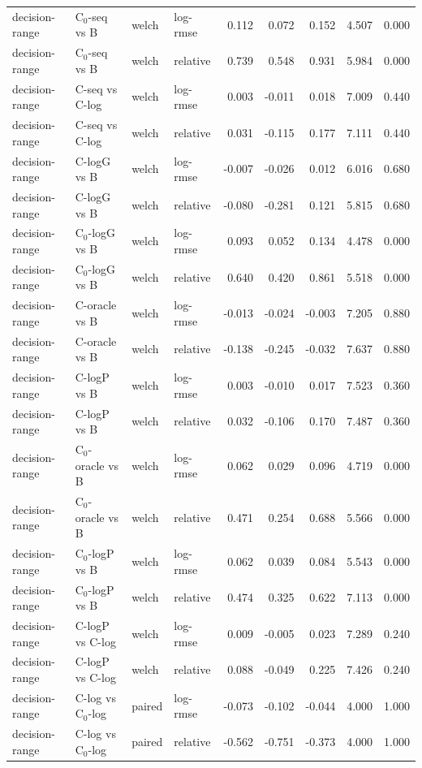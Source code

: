 \begin{longtable}{llllrrrrr}
decision-range & C$_0$-seq vs B & welch & log-rmse & 0.112 & 0.072 & 0.152 & 4.507 & 0.000 \\
decision-range & C$_0$-seq vs B & welch & relative & 0.739 & 0.548 & 0.931 & 5.984 & 0.000 \\
decision-range & C-seq vs C-log & welch & log-rmse & 0.003 & -0.011 & 0.018 & 7.009 & 0.440 \\
decision-range & C-seq vs C-log & welch & relative & 0.031 & -0.115 & 0.177 & 7.111 & 0.440 \\
decision-range & C-logG vs B & welch & log-rmse & -0.007 & -0.026 & 0.012 & 6.016 & 0.680 \\
decision-range & C-logG vs B & welch & relative & -0.080 & -0.281 & 0.121 & 5.815 & 0.680 \\
decision-range & C$_0$-logG vs B & welch & log-rmse & 0.093 & 0.052 & 0.134 & 4.478 & 0.000 \\
decision-range & C$_0$-logG vs B & welch & relative & 0.640 & 0.420 & 0.861 & 5.518 & 0.000 \\
decision-range & C-oracle vs B & welch & log-rmse & -0.013 & -0.024 & -0.003 & 7.205 & 0.880 \\
decision-range & C-oracle vs B & welch & relative & -0.138 & -0.245 & -0.032 & 7.637 & 0.880 \\
decision-range & C-logP vs B & welch & log-rmse & 0.003 & -0.010 & 0.017 & 7.523 & 0.360 \\
decision-range & C-logP vs B & welch & relative & 0.032 & -0.106 & 0.170 & 7.487 & 0.360 \\
decision-range & C$_0$-oracle vs B & welch & log-rmse & 0.062 & 0.029 & 0.096 & 4.719 & 0.000 \\
decision-range & C$_0$-oracle vs B & welch & relative & 0.471 & 0.254 & 0.688 & 5.566 & 0.000 \\
decision-range & C$_0$-logP vs B & welch & log-rmse & 0.062 & 0.039 & 0.084 & 5.543 & 0.000 \\
decision-range & C$_0$-logP vs B & welch & relative & 0.474 & 0.325 & 0.622 & 7.113 & 0.000 \\
decision-range & C-logP vs C-log & welch & log-rmse & 0.009 & -0.005 & 0.023 & 7.289 & 0.240 \\
decision-range & C-logP vs C-log & welch & relative & 0.088 & -0.049 & 0.225 & 7.426 & 0.240 \\
decision-range & C-log vs C$_0$-log & paired & log-rmse & -0.073 & -0.102 & -0.044 & 4.000 & 1.000 \\
decision-range & C-log vs C$_0$-log & paired & relative & -0.562 & -0.751 & -0.373 & 4.000 & 1.000 \\

\end{longtable}

